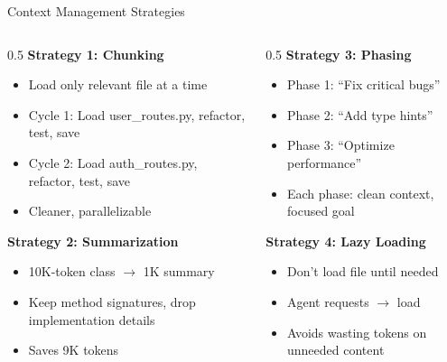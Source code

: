 \documentclass[aspectratio=169, 11pt]{beamer}
\begin{document}
\begin{frame}{Context Management Strategies}
    \begin{columns}[T]
        \begin{column}{0.5\textwidth}
            \textbf{Strategy 1: Chunking}
            \begin{itemize}
                \item Load only relevant file at a time
                \item Cycle 1: Load user\_routes.py, refactor, test, save
                \item Cycle 2: Load auth\_routes.py, refactor, test, save
                \item Cleaner, parallelizable
            \end{itemize}

            \vspace{0.3cm}
            \textbf{Strategy 2: Summarization}
            \begin{itemize}
                \item 10K-token class $\rightarrow$ 1K summary
                \item Keep method signatures, drop implementation details
                \item Saves 9K tokens
            \end{itemize}
        \end{column}
        \begin{column}{0.5\textwidth}
            \textbf{Strategy 3: Phasing}
            \begin{itemize}
                \item Phase 1: ``Fix critical bugs''
                \item Phase 2: ``Add type hints''
                \item Phase 3: ``Optimize performance''
                \item Each phase: clean context, focused goal
            \end{itemize}

            \vspace{0.3cm}
            \textbf{Strategy 4: Lazy Loading}
            \begin{itemize}
                \item Don't load file until needed
                \item Agent requests $\rightarrow$ load
                \item Avoids wasting tokens on unneeded content
            \end{itemize}
        \end{column}
    \end{columns}


\end{frame}
\end{document}
